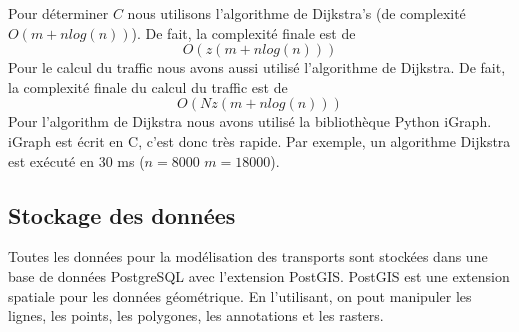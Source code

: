 
Pour déterminer $C$ nous utilisons l'algorithme de Dijkstra's (de complexité $O(m +n log(n) )$). De fait, la complexité finale est de
$$O(z (m + n log(n)))$$
Pour le calcul du traffic nous avons aussi utilisé l'algorithme de Dijkstra. De fait, la complexité finale du calcul du traffic est de  
$$O(N z (m + n log(n)))$$
Pour l'algorithm de Dijkstra nous avons utilisé la bibliothèque Python iGraph. iGraph est écrit en C, c'est donc très rapide. Par exemple, un algorithme Dijkstra est exécuté en 30 ms ($n = 8000$ $m = 18000$).



\subsection{Stockage des données}


Toutes les données pour la modélisation des transports sont stockées dans une base de données PostgreSQL avec l'extension PostGIS. PostGIS est une extension spatiale pour les données géométrique. En l'utilisant, on pout manipuler les lignes, les points, les polygones, les annotations et les rasters.



